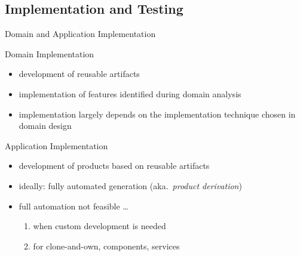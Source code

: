 \subsection{Implementation and Testing}
\begin{frame}{Domain and Application Implementation}
	\begin{mycolumns}[T,columns=3,widths={10}]
		\renewcommand{\projectcartoonwidth}{1}
	\mynextcolumn
		\begin{definition}{Domain Implementation} %
			\begin{itemize}
				\item development of reusable artifacts
				\item implementation of features identified during domain analysis
				\item implementation largely depends on the implementation technique chosen in domain design
			\end{itemize}
		\end{definition}
	\mynextcolumn
		\begin{definition}{Application Implementation}
			\begin{itemize}
				\item development of products based on reusable artifacts
				\item ideally: fully automated generation (aka.\ \emph{product derivation})
				\item full automation not feasible \ldots
					\begin{enumerate}
						\item when custom development is needed
						\item for clone-and-own, components, services
					\end{enumerate}
			\end{itemize}
		\end{definition}
	\end{mycolumns}
\end{frame}


